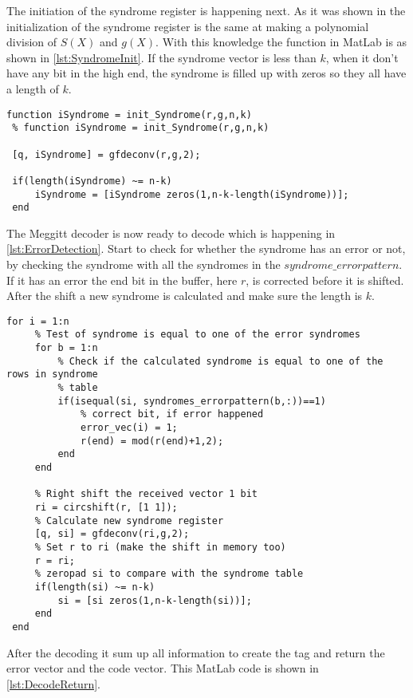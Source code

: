 \documentclass[Main]{subfiles}
\begin{document}
The initiation of the syndrome register is happening next.
As it was shown in  the initialization of the syndrome register is the same at making a polynomial division of $S(X)$ and $g(X)$.
With this knowledge the function in MatLab is as shown in \codeTitle \ref{lst:SyndromeInit}.
If the syndrome vector is less than $k$, when it don't have any bit in the high end, the syndrome is filled up with zeros so they all have a length of $k$.

\begin{lstlisting}[caption=Syndrome initialization, style=Code-Matlab, label=lst:SyndromeInit]
 function iSyndrome = init_Syndrome(r,g,n,k)
 % function iSyndrome = init_Syndrome(r,g,n,k)
 
 [q, iSyndrome] = gfdeconv(r,g,2);
 
 if(length(iSyndrome) ~= n-k)
     iSyndrome = [iSyndrome zeros(1,n-k-length(iSyndrome))];
 end
\end{lstlisting}

The Meggitt decoder is now ready to decode which is happening in \codeTitle \ref{lst:ErrorDetection}.
Start to check for whether the syndrome has an error or not, by checking the syndrome with all the syndromes in the $syndrome\_errorpattern$.
If it has an error the end bit in the buffer, here $r$, is corrected before it is shifted.
After the shift a new syndrome is calculated and make sure the length is $k$.

\begin{lstlisting}[caption=Error detection, style=Code-Matlab, label=lst:ErrorDetection]
 for i = 1:n
     % Test of syndrome is equal to one of the error syndromes
     for b = 1:n
         % Check if the calculated syndrome is equal to one of the rows in syndrome
         % table
         if(isequal(si, syndromes_errorpattern(b,:))==1)
             % correct bit, if error happened
             error_vec(i) = 1;
             r(end) = mod(r(end)+1,2);
         end
     end
     
     % Right shift the received vector 1 bit
     ri = circshift(r, [1 1]);
     % Calculate new syndrome register
     [q, si] = gfdeconv(ri,g,2);
     % Set r to ri (make the shift in memory too)
     r = ri;
     % zeropad si to compare with the syndrome table
     if(length(si) ~= n-k)
         si = [si zeros(1,n-k-length(si))];
     end
 end
\end{lstlisting}

After the decoding it sum up all information to create the tag and return the error vector and the code vector.
This MatLab code is shown in \codeTitle \ref{lst:DecodeReturn}.
\end{document}
